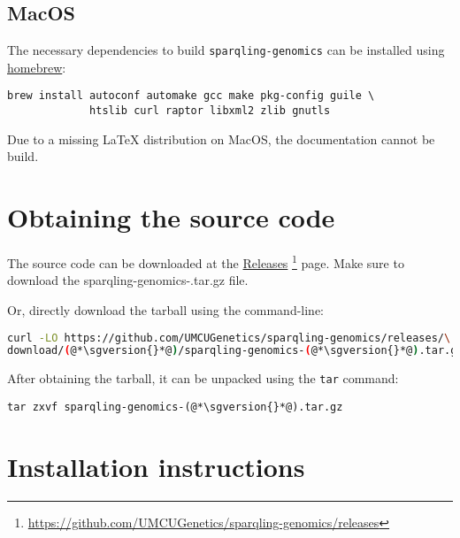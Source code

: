 \subsection{MacOS}

  The necessary dependencies to build \texttt{sparqling-genomics} can be
  installed using \href{https://brew.sh/}{homebrew}:

\begin{siderules}
\begin{verbatim}
brew install autoconf automake gcc make pkg-config guile \
             htslib curl raptor libxml2 zlib gnutls
\end{verbatim}
\end{siderules}

  Due to a missing \LaTeX{} distribution on MacOS, the documentation
  cannot be build.

\section{Obtaining the source code}
\label{sec:obtaining-tarball}

  \begin{sloppypar}
  The source code can be downloaded at the
  \href{https://github.com/UMCUGenetics/sparqling-genomics/releases}%
  {Releases}%
  \footnote{\url{https://github.com/UMCUGenetics/sparqling-genomics/releases}}
  page.  Make sure to download the {\fontfamily{\ttdefault}\selectfont
    sparqling-genomics-\sgversion{}.tar.gz} file.
  \end{sloppypar}

  Or, directly download the tarball using the command-line:
\begin{siderules}
\begin{lstlisting}[language=bash]
curl -LO https://github.com/UMCUGenetics/sparqling-genomics/releases/\
download/(@*\sgversion{}*@)/sparqling-genomics-(@*\sgversion{}*@).tar.gz
\end{lstlisting}
\end{siderules}

  After obtaining the tarball, it can be unpacked using the \texttt{tar}
  command:

\begin{siderules}
\begin{lstlisting}
tar zxvf sparqling-genomics-(@*\sgversion{}*@).tar.gz
\end{lstlisting}
\end{siderules}

\section{Installation instructions}

